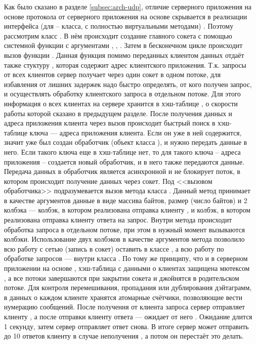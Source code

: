 Как было сказано в разделе \ref{subsec:arch-udp}, отличие серверного приложения на основе протокола  от серверного приложения на основе  скрывается в реализации интерфейса (для  -- класса, с полностью виртуальными методами) . Поэтому рассмотрим класс . В нём происходит создание главного сокета с помощью системной функции  с аргументами , , . Затем в бесконечном цикле происходит вызов функции . Данная функция помимо переданных клиентом данных отдаёт также стуктуру , которая содержит адрес клиентского приложения. Т.к. запросы от всех клиентов сервер получает через один сокет в одном потоке, для избавления от лишних задержек надо быстро определять, от кого получен запрос, и осуществлять обработку клиентского запроса в отдельном потоке. Для этого информация о всех клиентах на сервере хранится в хэш-таблице , о скорости работы которой сказано в предыдущем разделе. После получения данных и адреса приложения клиента через вызов  происходит быстрый поиск в хэш-таблице ключа --- адреса приложения клиента. Если он уже в ней содержится, значит уже был создан обработчик (объект класса ), и нужно передать данные в него. Если такого ключа еще в хэш-таблице нет, то для такого ключа -- адреса приложения -- создается новый обработчик, и в него также передаются данные. Передача данных в обработчик является асинхронной и не блокирует поток, в котором происходит получение данных через сокет. Под <<вызовом обработчика>> подразумевается вызов метода  класса . Данный метод принимает в качестве аргументов данные в виде массива байтов, размер (число байтов) и 2 колбэка --- колбэк, в котором реализована отправка клиенту , и колбэк, в котором реализована отправка клиенту ответа на запрос. Внутри метода  происходит обработка запроса в отдельном потоке, при этом в нужный момент вызываются колбэки. Использование двух колбэков в качестве аргументов метода  позволило всю работу с сетью (запись в сокет) оставить в классе , а всю работу по обработке запросов --- внутри класса . По тому же принципу, что и в серверном приложении на основе , хэш-таблица с данными о клиентах защищена мютексом , а все потоки завершаются при закрытии сокета и джойнятся в родительском потоке. Для контроля перемешивания, пропадания или дублирования дэйтаграмм, в данных о каждом клиенте хранятся атомарные счётчики, позволяющие вести нумерацию сообщений. После получения от клиента запроса сервер отправляет клиенту , а после отправки клиенту ответа --- ожидает от него . Ожидание длится 1 секунду, затем сервер отправляет ответ снова. В итоге сервер может отправить до 10 ответов клиенту в случае неполучения , а потом он перестаёт это делать.

